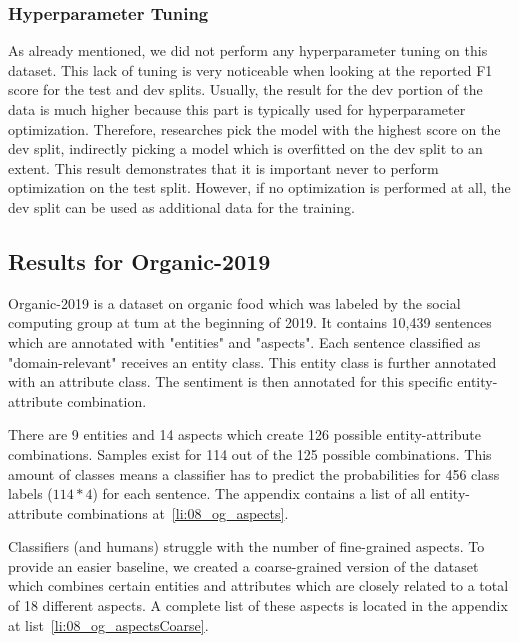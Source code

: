 \subsubsection*{Hyperparameter Tuning}
\label{sec:06_hpTuningAmazon}
As already mentioned, we did not perform any hyperparameter tuning on this dataset. This lack of tuning is very noticeable when looking at the reported F1 score for the test and dev splits. Usually, the result for the dev portion of the data is much higher because this part is typically used for hyperparameter optimization. Therefore, researches pick the model with the highest score on the dev split, indirectly picking a model which is overfitted on the dev split to an extent. This result demonstrates that it is important never to perform optimization on the test split. However, if no optimization is performed at all, the dev split can be used as additional data for the training.  



\subsection{Results for Organic-2019}
\label{sec:06_ResultsOrganic}

Organic-2019 is a dataset on organic food which was labeled by the social computing group at \gls{tum} at the beginning of 2019. It contains 10,439 sentences which are annotated with "entities" and "aspects". Each sentence classified as "domain-relevant" receives an entity class. This entity class is further annotated with an attribute class. The sentiment is then annotated for this specific entity-attribute combination.
\medskip

There are 9 entities and 14 aspects which create 126 possible entity-attribute combinations. Samples exist for 114 out of the 125 possible combinations. This amount of classes means a classifier has to predict the probabilities for 456 class labels {($114*4$)} for each sentence. The appendix contains a list of all entity-attribute combinations at~\ref{li:08_og_aspects}.
\medskip

Classifiers {(and humans)} struggle with the number of fine-grained aspects. To provide an easier baseline, we created a coarse-grained version of the dataset which combines certain entities and attributes which are closely related to a total of 18 different aspects. A complete list of these aspects is located in the appendix at list~\ref{li:08_og_aspectsCoarse}.
\medskip


